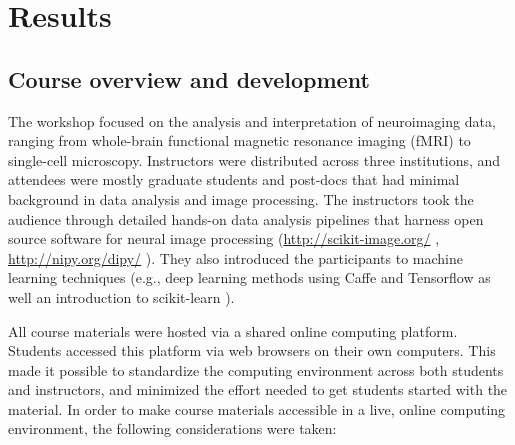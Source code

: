 \section{Results}

\subsection{Course overview and development}

The workshop focused on the analysis and interpretation of neuroimaging data,
ranging from whole-brain functional magnetic resonance imaging (fMRI) to
single-cell microscopy. Instructors were distributed across three institutions,
and attendees were mostly graduate students and post-docs that had minimal
background in data analysis and image processing. The instructors took the
audience through detailed hands-on data analysis pipelines that harness open
source software for neural image processing (\url{http://scikit-image.org/}
\cite{van2014scikit}, \url{http://nipy.org/dipy/}
\cite{Garyfallidis2014FrontNeuroinf}). They also introduced the participants to
machine learning techniques (e.g., deep learning methods using Caffe
\cite{jia2014caffe} and Tensorflow \cite{abadi2016tensorflow} as well an
introduction to scikit-learn \cite{Pedregosa2012-dm}).

All course materials were hosted via a shared online computing platform.
Students accessed this platform via web browsers on their own computers.
This made it possible to standardize the computing environment across both
students and instructors, and minimized the effort needed to get students
started with the material. In order to make course materials accessible in a
live, online computing environment, the following considerations were taken:

